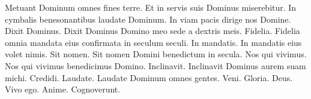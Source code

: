 \begin{multicols*}{2}
 Metuant Dominum omnes fines terre.
 Et in servis suis Dominus miserebitur.
 In cymbalis benesonantibus laudate Dominum.
 In viam pacis dirige nos Domine.
 Dixit Dominus.
 Dixit Dominus Domino meo sede a dextris meis.
 Fidelia.
 Fidelia omnia mandata eius confirmata in seculum seculi.
 In mandatis.
 In mandatis eius volet nimis.
 Sit nomen.
 Sit nomen Domini benedictum in secula.
 Nos qui vivimus.
 Nos qui vivimus benedicimus Domino.
 Inclinavit.
 Inclinavit Dominus aurem suam michi.
 Credidi.
 Laudate.
 Laudate Dominum omnes gentes.
 Veni.
 Gloria.
 Deus.
 Vivo ego.
 Anime.
 Cognoverunt.

\end{multicols*}
